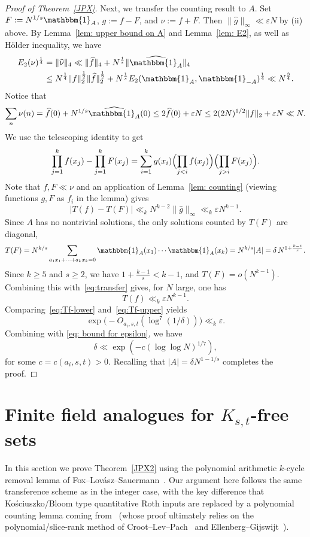 \documentclass[A4paper,reqno,oneside,12pt]{amsart}
\theoremstyle{plain}
\theoremstyle{definition}
\newcommand{\e}{\mathbbm{1}}          %
\begin{document}
\begin{proof}[Proof of Theorem~\ref{JPX}]
Next, we transfer the counting result to $A$.
Set $F:=N^{1/s}\e_A$, $g:=f-F$, and $\nu:=f+F$.
Then $\|\widehat g\|_\infty\ll \varepsilon N$ by (ii) above.
By Lemma~\ref{lem: upper bound on A} and Lemma~\ref{lem: E2}, as well as H\"older inequality, we have
\begin{align*}
    E_2(\nu)^{\frac{1}{4}}&=\| \widehat{\nu}\|_{4}\ll \| \widehat{f}\|_{4}+N^{\frac{1}{s}}\| \widehat{\e_A}\|_{4}\\
    &\leq N^{\frac{1}{4}}\| f\|_2^{\frac{1}{2}}\|\widehat{f}\|_2^{\frac{1}{2}}+ N^{\frac{1}{s}}E_2(\e_A,\e_{-A})^{\frac{1}{4}}\ll N^{\frac{3}{4}}. 
\end{align*}
Notice that
$$\sum_n \nu(n) = \widehat{f}(0)+N^{1/s}\widehat{\e_A}(0) \leq 2\widehat{f}(0) + \varepsilon N \leq 2 (2N)^{1/2}\| f\|_2+\varepsilon N\ll N.$$ We use 
the telescoping identity to get
\[
\prod_{j=1}^k f(x_j)-\prod_{j=1}^k F(x_j)
=\sum_{i=1}^k g(x_i)\Bigl(\prod_{j<i} f(x_j)\Bigr)\Bigl(\prod_{j>i} F(x_j)\Bigr). 
\]
Note that $f, F \ll \nu$ and an application of Lemma~\ref{lem: counting} (viewing functions $g, F$ as $f_i$ in the lemma) gives 
\begin{equation}\label{eq:transfer}
|T(f)-T(F)|\ll_k N^{k-2}\|\widehat g\|_\infty \ll_k \varepsilon N^{k-1}.
\end{equation}
Since $A$ has no nontrivial solutions, the only solutions counted by $T(F)$ are diagonal, 
\[
T(F)=N^{k/s}\sum_{a_1x_1+\cdots +a_kx_k=0}\e_A(x_1)\cdots\e_A(x_k)
=N^{k/s}|A|=\delta\,N^{1+\frac{k-1}{s}}.
\]
Since $k\ge 5$ and $s\ge 2$, we have $1+\frac{k-1}{s}<k-1$, and $T(F)=o(N^{k-1})$.
Combining this with~\eqref{eq:transfer} gives, for $N$ large, one has
\begin{equation}\label{eq:Tf-upper}
T(f)\ll_k \varepsilon N^{k-1}.
\end{equation}
Comparing~\eqref{eq:Tf-lower} and~\eqref{eq:Tf-upper} yields
\[
\exp\bigl(-O_{a_i,s,t}(\log^7(1/\delta))\bigr)\ll_k \varepsilon.
\]
Combining with \eqref{eq: bound for epsilon}, we have
\[
\delta\ll \exp(-c(\log\log N)^{1/7}),
\]
for some $c=c(a_i,s,t) > 0$. Recalling that $|A|=\delta N^{1-1/s}$ completes the proof.
\end{proof}

\section{Finite field analogues for $K_{s,t}$-free sets}\label{sec:finite-field}

In this section we prove Theorem~\ref{JPX2} using the polynomial arithmetic $k$-cycle removal lemma
of Fox--Lov\'asz--Sauermann~\cite{FLS}. Our argument here follows the same transference scheme as in the
integer case, with the key difference that Ko\'sciuszko/Bloom type quantitative Roth inputs are replaced by a
polynomial counting lemma coming from~\cite{FLS} (whose proof ultimately relies on the
polynomial/slice-rank method of Croot--Lev--Pach~\cite{CLP17} and Ellenberg--Gijswijt~\cite{EG}).
\end{document}
